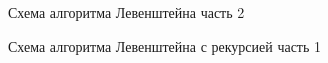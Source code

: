 \begin{figure}
	\caption{Схема алгоритма Левенштейна часть 2}
\end{figure}

\begin{figure}
	\caption{Схема алгоритма Левенштейна с рекурсией часть 1}
\end{figure}

